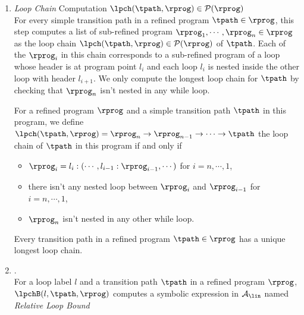 \begin{enumerate}
  \item \emph{Loop Chain} Computation $\lpch(\tpath, \rprog) \in \mathcal{P}(\rprog)$ 
  \\
  For every simple transition path in a refined program $\tpath \in \rprog$,
  this step computes 
  a list of sub-refined program $\rprog_1, \cdots, \rprog_n \in \rprog$
  as the loop chain $\lpch(\tpath, \rprog) \in \mathcal{P}(\rprog)$ of $\tpath$.
  Each of the $\rprog_i$ in this chain corresponds to a sub-refined program of a loop whose header is at program point $l_i$ and
 each loop $l_{i}$ is nested inside the other loop with header $l_{i+1}$.
 We only compute the longest loop chain for $\tpath$ by checking that
$\rprog_n$ isn't nested in any while loop.
\begin{defn}
  \label{def:loopchain}
For a refined program $\rprog$ and a simple transition path $\tpath$ in this program, we define
$\lpch(\tpath, \rprog) = 
\rprog_n \to \rprog_{n-1} \to \cdots \to \tpath$
the loop chain of
$\tpath$ in this program if and only if 
%
\begin{itemize}
\item $\rprog_{i}= l_i : (\cdots, l_{i - 1} : \rprog_{i-1}, \cdots)$ for $i = n, \cdots, 1$,
\item there isn't any nested loop between $\rprog_{i}$ and $\rprog_{i - 1}$ for $i = n, \cdots, 1$,
 \item $\rprog_n$ isn't nested in any other while loop.
\end{itemize}
\end{defn}
%
Every transition path in a refined program $\tpath \in \rprog$ has a unique longest loop chain.
%
%
%
\item  {}.
\\
For a loop label $l$ and a transition path $\tpath$ in a refined program $\rprog$,
 $\lpchB(l, \tpath, \rprog)$ computes a symbolic expression in $\mathcal{A}_{\lin}$ named \emph{Relative Loop Bound}

\end{enumerate}
